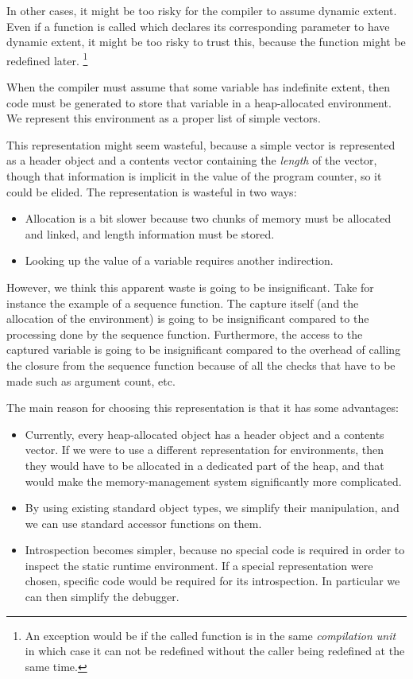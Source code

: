 In other cases, it might be too risky for the compiler to assume
dynamic extent.  Even if a function is called which declares its
corresponding parameter to have dynamic extent, it might be too risky
to trust this, because the function might be redefined later.%
\footnote{An exception would be if the called function is in the same
  \emph{compilation unit} in which case it can not be redefined
  without the caller being redefined at the same time.}

When the compiler must assume that some variable has indefinite
extent, then code must be generated to store that variable in a
heap-allocated environment.  We represent this environment as a proper
\cl{} list of simple vectors.  

This representation might seem wasteful, because a simple vector is
represented as a header object and a contents vector containing the
\emph{length} of the vector, though that information is implicit in
the value of the program counter, so it could be elided.  The
representation is wasteful in two ways:

\begin{itemize}
\item Allocation is a bit slower because two chunks of memory must be
  allocated and linked, and length information must be stored. 
\item Looking up the value of a variable requires another
  indirection. 
\end{itemize}

However, we think this apparent waste is going to be insignificant.
Take for instance the example of a sequence function.  The capture
itself (and the allocation of the environment) is going to be
insignificant compared to the processing done by the sequence
function.  Furthermore, the access to the captured variable is going
to be insignificant compared to the overhead of calling the closure
from the sequence function because of all the checks that have to be
made such as argument count, etc.  

The main reason for choosing this representation is that it has
some advantages:

\begin{itemize}
\item Currently, every heap-allocated object has a header object and a
  contents vector.  If we were to use a different representation for
  environments, then they would have to be allocated in a dedicated
  part of the heap, and that would make the memory-management system
  significantly more complicated.
\item By using existing standard object types, we simplify their
  manipulation, and we can use standard accessor functions on them.
\item Introspection becomes simpler, because no special code is
  required in order to inspect the static runtime environment.  If a
  special representation were chosen, specific code would be required
  for its introspection.  In particular we can then simplify the
  debugger. 
\end{itemize}

